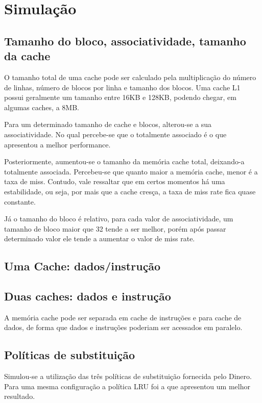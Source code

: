 \documentclass[12pt,a4paper]{article}
\begin{document}
\section{Simulação}

\subsection{Tamanho do bloco, associatividade, tamanho da cache}
O tamanho total de uma cache pode ser calculado pela multiplicação do
número de linhas, número de blocos por linha e tamanho dos blocos.
Uma cache L1 possui geralmente um tamanho entre 16KB e 128KB, podendo chegar, em algumas caches, a 8MB.

Para um determinado tamanho de cache e blocos, alterou-se a sua
associatividade. No qual percebe-se que o totalmente associado é o que
apresentou a melhor performance.

Posteriormente, aumentou-se o tamanho da memória cache total, deixando-a totalmente associada.
Percebeu-se que quanto maior a memória cache, menor é a taxa de miss. Contudo, vale ressaltar que
em certos momentos há uma estabilidade, ou seja, por mais que a cache cresça, a taxa de miss rate fica quase
constante.

Já o tamanho do bloco é relativo, para cada valor de associatividade, um tamanho de bloco maior que 32
tende a ser melhor, porém após passar determinado valor ele tende a aumentar o valor de miss rate.

\subsection{Uma Cache:  dados/instrução }

\subsection{Duas caches:  dados e  instrução}
A memória cache pode ser separada em cache de instruções e para cache de dados,
de forma que dados e instruções poderiam ser acessados em paralelo. 

\subsection{Políticas de substituição}
Simulou-se a utilização das três políticas de substituição fornecida
pelo Dinero.
Para uma mesma configuração a política LRU foi a que apresentou um
melhor resultado.
\end{document}
